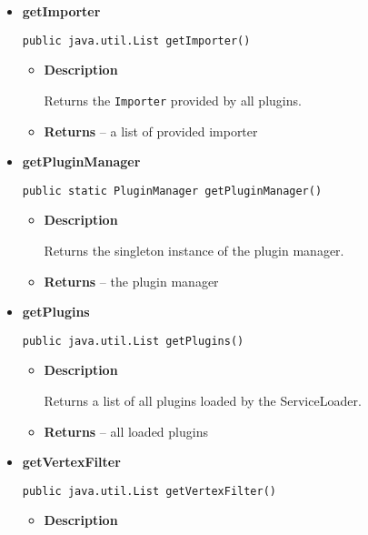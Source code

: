 {{{{{{{{{{{{{{\begin{itemize}
{\begin{itemize}
{Returns the \texttt{\small Exporter}{\small 
{}} provided by all plugins.
}
\item{{\bf  Returns} -- 
a list of provided exporter 
}%
\end{itemize}
}%
\item{ 
{\bf  getImporter}\\
\begin{lstlisting}[frame=none]
public java.util.List getImporter()\end{lstlisting} %
\begin{itemize}
\item{
{\bf  Description}

Returns the \texttt{\small Importer}{\small 
{}} provided by all plugins.
}
\item{{\bf  Returns} -- 
a list of provided importer 
}%
\end{itemize}
}%
\item{ 
{\bf  getPluginManager}\\
\begin{lstlisting}[frame=none]
public static PluginManager getPluginManager()\end{lstlisting} %
\begin{itemize}
\item{
{\bf  Description}

Returns the singleton instance of the plugin manager.
}
\item{{\bf  Returns} -- 
the plugin manager 
}%
\end{itemize}
}%
\item{ 
{\bf  getPlugins}\\
\begin{lstlisting}[frame=none]
public java.util.List getPlugins()\end{lstlisting} %
\begin{itemize}
\item{
{\bf  Description}

Returns a list of all plugins loaded by the ServiceLoader.
}
\item{{\bf  Returns} -- 
all loaded plugins 
}%
\end{itemize}
}%
\item{ 
{\bf  getVertexFilter}\\
\begin{lstlisting}[frame=none]
public java.util.List getVertexFilter()\end{lstlisting} %
\begin{itemize}
\item{
{\bf  Description}

}
\end{itemize}}
\end{itemize}}}}}}}}}}}}}}}
